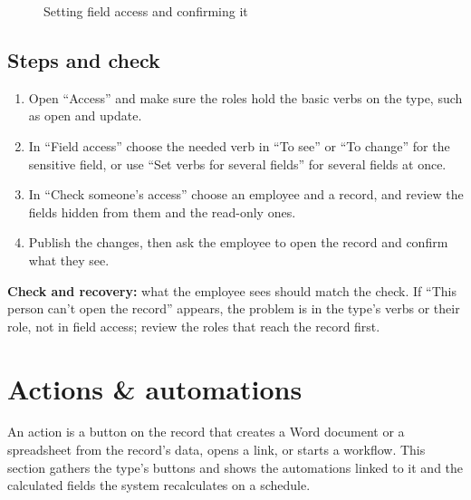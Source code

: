 \begin{figure}[H]
\centering
{}
\rclegend
\caption{Setting field access and confirming it}
\label{fig:builder-field-access-flow}
\end{figure}

\subsection{Steps and check}
\begin{enumerate}
\item Open “Access” and make sure the roles hold the basic verbs on the type, such as open and update.
\item In “Field access” choose the needed verb in “To see” or “To change” for the sensitive field, or use “Set verbs for several fields” for several fields at once.
\item In “Check someone’s access” choose an employee and a record, and review the fields hidden from them and the read-only ones.
\item Publish the changes, then ask the employee to open the record and confirm what they see.
\end{enumerate}

\textbf{Check and recovery:} what the employee sees should match the check. If “This person can’t open the record” appears, the problem is in the type's verbs or their role, not in field access; review the roles that reach the record first.

\clearpage
\section{Actions \& automations}
\label{sec:builder-feature-actions}

An action is a button on the record that creates a Word document or a spreadsheet from the record's data, opens a link, or starts a workflow. This section gathers the type's buttons and shows the automations linked to it and the calculated fields the system recalculates on a schedule.

